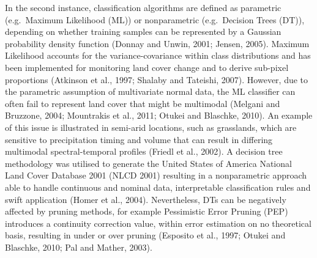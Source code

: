 \documentclass[]{book}
\begin{document}
In the second instance, classification algorithms are defined as
parametric (e.g.~Maximum Likelihood (ML)) or nonparametric
(e.g.~Decision Trees (DT)), depending on whether training samples can be
represented by a Gaussian probability density function (Donnay and
Unwin, 2001; Jensen, 2005). Maximum Likelihood accounts for the
variance-covariance within class distributions and has been implemented
for monitoring land cover change and to derive sub-pixel proportions
(Atkinson et al., 1997; Shalaby and Tateishi, 2007). However, due to the
parametric assumption of multivariate normal data, the ML classifier can
often fail to represent land cover that might be multimodal (Melgani and
Bruzzone, 2004; Mountrakis et al., 2011; Otukei and Blaschke, 2010). An
example of this issue is illustrated in semi-arid locations, such as
grasslands, which are sensitive to precipitation timing and volume that
can result in differing multimodal spectral-temporal profiles (Friedl et
al., 2002). A decision tree methodology was utilised to generate the
United States of America National Land Cover Database 2001 (NLCD 2001)
resulting in a nonparametric approach able to handle continuous and
nominal data, interpretable classification rules and swift application
(Homer et al., 2004). Nevertheless, DTs can be negatively affected by
pruning methods, for example Pessimistic Error Pruning (PEP) introduces
a continuity correction value, within error estimation on no theoretical
basis, resulting in under or over pruning (Esposito et al., 1997; Otukei
and Blaschke, 2010; Pal and Mather, 2003).
\end{document}
